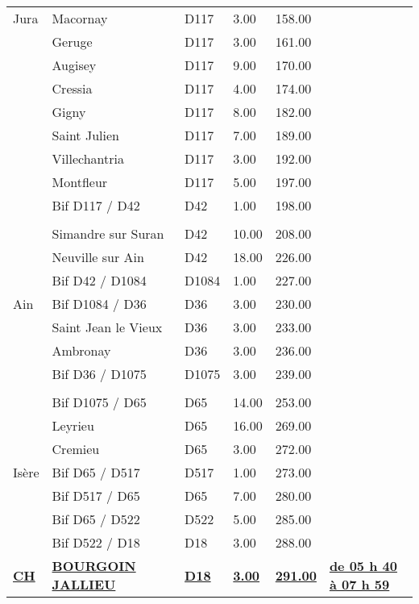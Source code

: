 \documentclass{article}%
\begin{document}
\begin{longtable}{p{2.25cm}|p{6.7cm}|p{2.0cm}|p{1.5cm}|p{1.5cm}|p{3.5cm}}
Jura&Macornay&D117&3.00&158.00& \\%
 &Geruge&D117&3.00&161.00& \\%
 &Augisey&D117&9.00&170.00& \\%
 &Cressia&D117&4.00&174.00& \\%
 &Gigny&D117&8.00&182.00& \\%
 &Saint Julien&D117&7.00&189.00& \\%
 &Villechantria&D117&3.00&192.00& \\%
 &Montfleur&D117&5.00&197.00& \\%
 &Bif D117 / D42&D42&1.00&198.00& \\%
\hline& & & & & \\%
 &Simandre sur Suran&D42&10.00&208.00& \\%
 &Neuville sur Ain&D42&18.00&226.00& \\%
 &Bif D42 / D1084&D1084 &1.00&227.00& \\%
Ain&Bif D1084 / D36&D36&3.00&230.00& \\%
 &Saint Jean le Vieux&D36&3.00&233.00& \\%
 &Ambronay&D36&3.00&236.00& \\%
 &Bif D36 / D1075&D1075&3.00&239.00& \\%
\hline& & & & & \\%
 &Bif D1075 / D65&D65&14.00&253.00& \\%
 &Leyrieu&D65&16.00&269.00& \\%
 &Cremieu&D65&3.00&272.00& \\%
Isère&Bif D65 / D517&D517 &1.00&273.00& \\%
 &Bif D517 / D65&D65 &7.00&280.00& \\%
 &Bif D65 / D522&D522&5.00&285.00& \\%
 &Bif D522 / D18&D18&3.00&288.00& \\%
\textbf{\underline{                               CH }}&\textbf{\underline{BOURGOIN  JALLIEU}}&\textbf{\underline{D18}}&\textbf{\underline{3.00}}&\textbf{\underline{291.00}}&\textbf{\underline{de 05 h 40 à 07 h 59}}\\%
\hline%
\end{longtable}%
\begin{flushleft} \textit{} \end{flushleft}%
\end{document}

